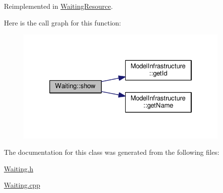 Reimplemented in \hyperlink{class_waiting_resource_afb0323a90d99b50d66de7f38d069b122}{Waiting\-Resource}.



Here is the call graph for this function\-:\nopagebreak
\begin{figure}[H]
\begin{center}
\leavevmode
\includegraphics[width=298pt]{class_waiting_aa8b8a3e589f580e3e066a0f9423f4c76_cgraph}
\end{center}
\end{figure}




The documentation for this class was generated from the following files\-:\begin{DoxyCompactItemize}
\item 
\hyperlink{_waiting_8h}{Waiting.\-h}\item 
\hyperlink{_waiting_8cpp}{Waiting.\-cpp}\end{DoxyCompactItemize}

